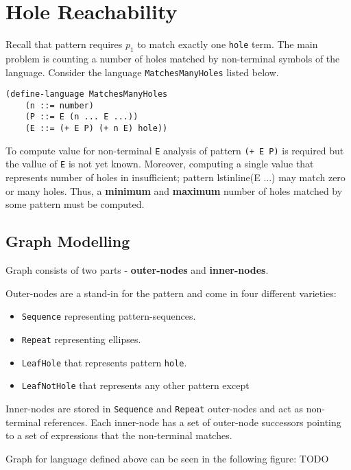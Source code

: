 \section{Hole Reachability}

Recall that pattern \InHolePattern requires $p_1$ to match exactly one \lstinline{hole} term. The main problem is counting a number of holes matched by non-terminal symbols of the language. Consider the language \lstinline{MatchesManyHoles} listed below.

\begin{lstlisting}
(define-language MatchesManyHoles
	(n ::= number)
	(P ::= E (n ... E ...))
	(E ::= (+ E P) (+ n E) hole))
\end{lstlisting}

To compute value for non-terminal \lstinline{E} analysis of pattern \lstinline{(+ E P)} is required but the vallue of \lstinline{E} is not yet known. Moreover, computing a single value that represents number of holes in insufficient; pattern lstinline{(E ...)} may match zero or many holes. Thus, a \textbf{minimum} and \textbf{maximum} number of holes matched by some pattern must be computed. 

\subsection{Graph Modelling}

Graph consists of two parts - \textbf{outer-nodes} and \textbf{inner-nodes}.

Outer-nodes are a stand-in for the pattern and come in four different varieties:

\begin{itemize}
\item \lstinline{Sequence} representing pattern-sequences.
\item \lstinline{Repeat} representing ellipses.
\item \lstinline{LeafHole} that represents pattern \lstinline{hole}.
\item \lstinline{LeafNotHole} that represents any other pattern except \InHolePattern
\end{itemize}

Inner-nodes are stored in \lstinline{Sequence} and \lstinline{Repeat} outer-nodes and act as non-terminal references. Each inner-node has a set of outer-node successors pointing to a set of expressions that the non-terminal matches. 

Graph for language defined above can be seen in the following figure: 
TODO

